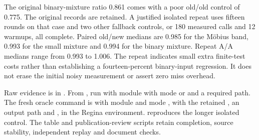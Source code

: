 The original binary-mixture ratio 0.861 comes with a poor old/old control
of 0.775. The original records are retained. A justified isolated repeat
uses fifteen rounds on that case and two other fallback controls, or 180
measured calls and 12 warmups, all complete. Paired old/new medians are
0.985 for the M\"obius band, 0.993 for the small mixture and 0.994 for
the binary mixture. Repeat A/A medians range from 0.993 to 1.006. The
repeat indicates small extra finite-test costs rather than establishing
a fourteen-percent binary-input regression. It does not erase the initial
noisy measurement or assert zero miss overhead.

\begin{sloppypar}
Raw evidence is in . From ,
run  with module
\allowbreak{}
with mode  or  and a required
 path. The fresh oracle command is
 with module 
and mode , with the
retained , an output
path and , in the Regina environment.
 reproduces the longer
isolated control. The table and publication-review scripts retain
completion, source stability, independent replay and document checks.
\end{sloppypar}
